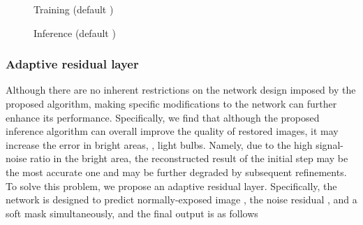 \documentclass[10pt,twocolumn,letterpaper]{article}
\begin{document}
\begin{figure}[t]
\vspace{-3mm}
\begin{algorithm}[H]
    \caption{Training (default )}
    \label{alg:training}
\end{algorithm}
\vspace{-1cm}
\end{figure}

\begin{figure}[t]
\begin{algorithm}[H]
    \caption{Inference (default )}
    \label{alg:inference}
\end{algorithm}
\vspace{-0.9cm}
\end{figure}

\vspace{-0.1cm}
\subsubsection{Adaptive residual layer}
Although there are no inherent restrictions on the network design imposed by the proposed algorithm, making specific modifications to the network can further enhance its performance.
Specifically, we find that although the proposed inference algorithm can overall improve the quality of restored images, it may increase the error in bright areas, \eg, light bulbs. Namely, due to the high signal-noise ratio in the bright area, the reconstructed result of the initial step may be the most accurate one and may be further degraded by subsequent refinements. To solve this problem, we propose an adaptive residual layer. Specifically, the network  is designed to predict normally-exposed image , the noise residual , and a soft mask  simultaneously, and the final output  is as follows
\end{document}
